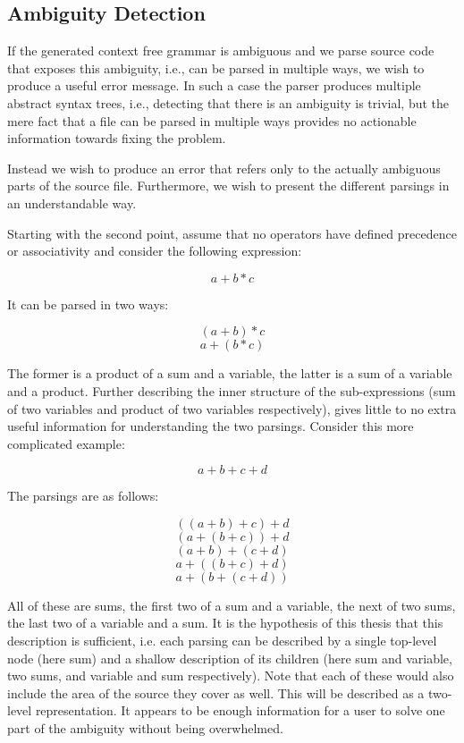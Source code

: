 \documentclass{kththesis}
\begin{document}
\subsection{Ambiguity Detection} \label{sec:implementation-ambiguity-detection}

If the generated context free grammar is ambiguous and we parse source code that exposes this ambiguity, i.e., can be parsed in multiple ways, we wish to produce a useful error message. In such a case the parser produces multiple abstract syntax trees, i.e., detecting that there is an ambiguity is trivial, but the mere fact that a file can be parsed in multiple ways provides no actionable information towards fixing the problem.

Instead we wish to produce an error that refers only to the actually ambiguous parts of the source file. Furthermore, we wish to present the different parsings in an understandable way.

Starting with the second point, assume that no operators have defined precedence or associativity and consider the following expression:

$$ a + b * c $$

It can be parsed in two ways:

$$ (a + b) * c $$
$$ a + (b * c) $$

The former is a product of a sum and a variable, the latter is a sum of a variable and a product. Further describing the inner structure of the sub-expressions (sum of two variables and product of two variables respectively), gives little to no extra useful information for understanding the two parsings. Consider this more complicated example:

$$ a + b + c + d $$

The parsings are as follows:

$$ ((a + b) + c) + d $$
$$ (a + (b + c)) + d $$
$$ (a + b) + (c + d) $$
$$ a + ((b + c) + d) $$
$$ a + (b + (c + d)) $$

All of these are sums, the first two of a sum and a variable, the next of two sums, the last two of a variable and a sum. It is the hypothesis of this thesis that this description is sufficient, i.e. each parsing can be described by a single top-level node (here sum) and a shallow description of its children (here sum and variable, two sums, and variable and sum respectively). Note that each of these would also include the area of the source they cover as well. This will be described as a two-level representation. It appears to be enough information for a user to solve one part of the ambiguity without being overwhelmed.
\end{document}
